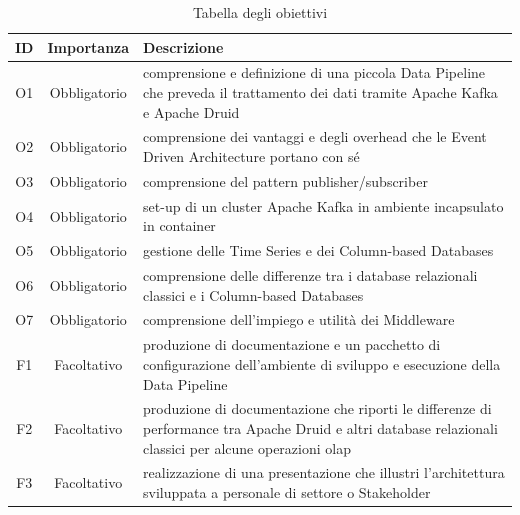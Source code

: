 \begin{table}[htbp]
    \centering
    \caption{Tabella degli obiettivi}    
    \label{tab:Tabella1}
    \begin{tabularx}{\textwidth}{|c|c|X|}
        \hline
        \textbf{ID} & \textbf{Importanza} & \textbf{Descrizione} \\\hline
        O1 & Obbligatorio & comprensione e definizione di una piccola \gls{Data Pipeline}{}  che  preveda il trattamento dei dati
        tramite Apache Kafka e Apache Druid \\\hline
        O2 & Obbligatorio & comprensione dei vantaggi e degli overhead  che le Event Driven Architecture portano con
        sé\\\hline
        O3 & Obbligatorio & comprensione del pattern publisher/subscriber \\\hline
        O4 & Obbligatorio & set-up di un cluster Apache Kafka in ambiente incapsulato in \gls{container}{} \\ \hline
        O5 & Obbligatorio & gestione delle Time Series e dei Column-based Databases \\\hline
        O6 & Obbligatorio & comprensione delle differenze tra i database relazionali  classici e i Column-based Databases\\\hline
        O7 & Obbligatorio &comprensione dell’impiego e utilità dei \gls{Middleware}{} \\\hline
        F1 & Facoltativo & produzione di documentazione e un pacchetto di configurazione  dell’ambiente di sviluppo e
        esecuzione  della \gls{Data Pipeline}{}\\\hline
        F2 & Facoltativo & produzione di documentazione che riporti  le differenze  di performance  tra Apache Druid e altri
         database relazionali classici per alcune  operazioni \gls{olap}{} \\\hline
        F3 & Facoltativo & realizzazione di una presentazione che illustri l’architettura  sviluppata  a personale di settore o
        Stakeholder \\\hline
    \end{tabularx} 

\end{table}
\pagebreak
\pagebreak

